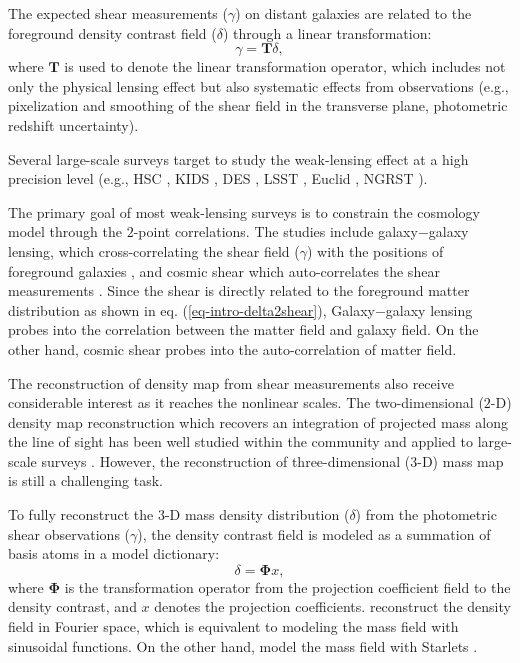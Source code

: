 \documentclass[twocolumn]{aastex63}
\begin{document}
The expected shear measurements ($\gamma$) on distant galaxies are related to
the foreground density contrast field ($\delta$) through a linear
transformation: \begin{equation} \label{eq-intro-delta2shear} \gamma=\mathbf{T}
\delta, \end{equation} where $\mathbf{T}$ is used to denote the linear
transformation operator, which includes not only the physical lensing effect
but also systematic effects from observations (e.g., pixelization and smoothing
of the shear field in the transverse plane, photometric redshift
uncertainty).

Several large-scale surveys target to study the weak-lensing effect at a high
precision level (e.g., HSC \citep{HSC1-data}, KIDS \citep{KIDS13}, DES
\citep{DES05}, LSST \citep{LSSTScienceBook}, Euclid \citep{Euclid2011}, NGRST
\citep{WFIRST15}).

The primary goal of most weak-lensing surveys is to constrain the cosmology
model through the $2$-point correlations. The studies include galaxy$-$galaxy
lensing, which cross-correlating the shear field ($\gamma$) with the positions
of foreground galaxies
\citep{gglens-GAMA-Han2014,gglens-BossCFHTMore2015,gglens-DES1}, and cosmic
shear which auto-correlates the shear measurements
\citep{cosmicShearRealKids450,cosmicShear-DES1,cosmicShear_HSC1_Chiaki2019,cosmicShear_HSC1_Hamana2019}.
Since the shear is directly related to the foreground matter distribution as
shown in eq. (\ref{eq-intro-delta2shear}), Galaxy$-$galaxy lensing probes into
the correlation between the matter field and galaxy field. On the other hand,
cosmic shear probes into the auto-correlation of matter field.

The reconstruction of density map from shear measurements also receive
considerable interest as it reaches the nonlinear scales. The two-dimensional
($2$-D) density map reconstruction which recovers an integration of projected
mass along the line of sight has been well studied within the community
\citep{massMap-KS1993,WL-massMap-Glimpse2D-Lanusse2016,sparseBaysianMassMap-Price2020}
and applied to large-scale surveys
\citep{HSC1-massMaps,massMapDES-Chang2018,DES-SV-massMap-sparsity}. However,
the reconstruction of three-dimensional ($3$-D) mass map is still a challenging
task.

To fully reconstruct the $3$-D mass density distribution ($\delta$) from the
photometric shear observations ($\gamma$), the density contrast field is
modeled as a summation of basis atoms in a model dictionary:
\begin{equation} \label{eq-intro-dict}
 \delta= \mathbf{\Phi} x,
\end{equation}
where $\mathbf{\Phi}$ is the transformation operator from the projection
coefficient field to the density contrast, and $x$ denotes the projection
coefficients. \citet{LSS-massMap-Wiener-Simon2009} reconstruct the density
field in Fourier space, which is equivalent to modeling the mass field with
sinusoidal functions.  On the other hand,
\citet{LSS-massMap-Glimpse3D-Leonard2014} model the mass field with Starlets
\citep{Starlet-Starck2015}.
\end{document}
